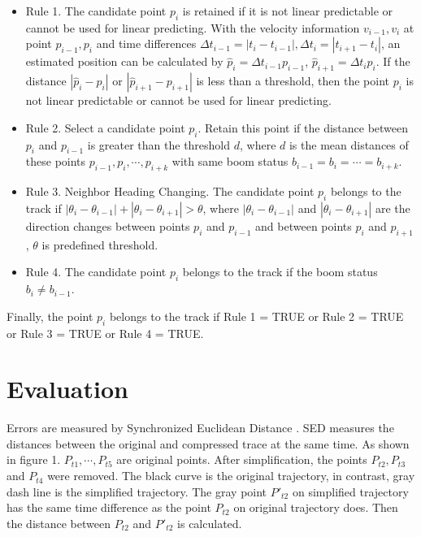 \begin{itemize}
\item Rule 1. The candidate point $p_i$ is retained if it is not linear predictable or cannot be used for linear predicting. With the velocity information $v_{i-1}, v_i$ at point $p_{i-1}, p_i$ and time differences $\Delta t_{i-1} = |t_{i}-t_{i-1}|,\Delta t_{i} = |t_{i+1}-t_{i}|$, an estimated position can be calculated by $\hat{p}_i=\Delta t_{i-1} p_{i-1}$, $\hat{p}_{i+1}=\Delta t_{i} p_{i}$. If the distance $|\hat{p}_i-p_i|$ or $|\hat{p}_{i+1}-p_{i+1}|$ is less than a threshold, then the point $p_i$ is not linear predictable or cannot be used for linear predicting.

\item Rule 2. Select a candidate point $p_i$. Retain this point if the distance between $p_i$ and $p_{i-1}$ is greater than the threshold $d$, where $d$ is the mean distances of these points $p_{i-1}, p_i, \cdots, p_{i+k}$ with same boom status $b_{i-1}=b_i=\cdots=b_{i+k}$. 

\item Rule 3. Neighbor Heading Changing. The candidate point $p_i$ belongs to the track if $|\theta_i-\theta_{i-1}| + |\theta_i-\theta_{i+1}|>\theta$, where $|\theta_i-\theta_{i-1}|$ and $ |\theta_i-\theta_{i+1}|$ are the direction changes between points $p_i$ and $p_{i-1}$ and between points $p_i$ and $p_{i+1}$, $\theta$ is predefined threshold.

\item Rule 4. The candidate point $p_i$ belongs to the track if the boom status $b_i\neq b_{i-1}$.
\end{itemize}

Finally, the point $p_i$ belongs to the track if Rule 1 = TRUE or Rule 2 = TRUE or Rule 3 = TRUE or Rule 4 = TRUE.

\section{Evaluation}
Errors are measured by Synchronized Euclidean Distance \cite{lawson2011compression}. SED measures the distances between the original and compressed trace at the same time. As shown in figure 1\cite{lawson2011compression}. $P_{t1}, \cdots ,P_{t5}$ are original points. After simplification, the points $P_{t2}, P_{t3}$ and $P_{t4}$ were removed. The black curve is the original trajectory, in contrast, gray dash line is the simplified trajectory. The gray point $P'_{t2}$ on simplified trajectory has the same time difference as the point $P_{t2}$ on original trajectory does. Then the distance between $P_{t2}$ and $P'_{t2}$ is calculated.


